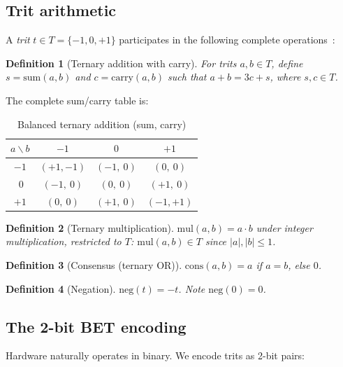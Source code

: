 \documentclass[journal,10pt,twocolumn]{IEEEtran}
\newtheorem{definition}{Definition}
\begin{document}
\subsection{Trit arithmetic}

A \emph{trit} $t \in T = \{-1, 0, +1\}$ participates in the following
complete operations~\cite{knuth1997art}:

\begin{definition}[Ternary addition with carry]
For trits $a, b \in T$, define $s = \mathrm{sum}(a,b)$ and
$c = \mathrm{carry}(a,b)$ such that $a + b = 3c + s$, where
$s, c \in T$.
\end{definition}

The complete sum/carry table is:

\begin{table}[h]
\centering
\small
\caption{Balanced ternary addition (sum, carry)}
\label{tab:add}
\begin{tabular}{c|ccc}
\toprule
$a \backslash b$ & $-1$ & $0$ & $+1$ \\
\midrule
$-1$ & $(+1,-1)$ & $(-1,\ 0)$ & $(0,\ 0)$ \\
$\ 0$ & $(-1,\ 0)$ & $(0,\ 0)$ & $(+1,\ 0)$ \\
$+1$ & $(0,\ 0)$ & $(+1,\ 0)$ & $(-1,+1)$ \\
\bottomrule
\end{tabular}
\end{table}

\begin{definition}[Ternary multiplication]
$\mathrm{mul}(a,b) = a \cdot b$ under integer multiplication,
restricted to $T$: $\mathrm{mul}(a,b) \in T$ since $|a|,|b| \leq 1$.
\end{definition}

\begin{definition}[Consensus (ternary OR)]
$\mathrm{cons}(a,b) = a$ if $a = b$, else $0$.
\end{definition}

\begin{definition}[Negation]
$\mathrm{neg}(t) = -t$. Note $\mathrm{neg}(0) = 0$.
\end{definition}

\subsection{The 2-bit BET encoding}

Hardware naturally operates in binary. We encode trits as 2-bit pairs:
\end{document}
